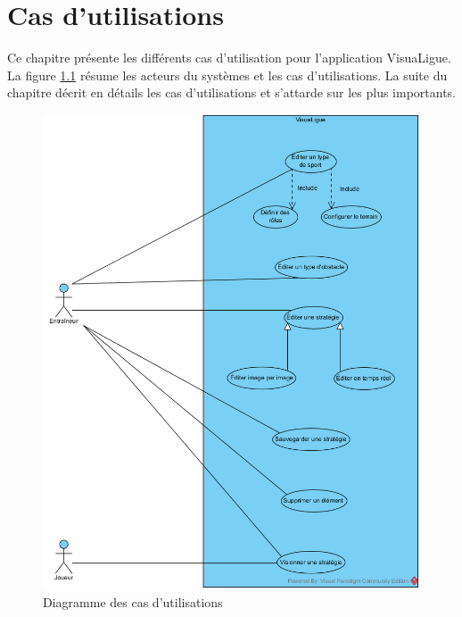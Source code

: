 
\chapter{Cas d'utilisations}
\label{s:cas_utilisation}

Ce chapitre présente les différents cas d'utilisation pour l'application VisuaLigue.
La figure \ref{fig:cas_utilisation_diag} résume les acteurs du systèmes et les cas d'utilisations.
La suite du chapitre décrit en détails les cas d'utilisations et s'attarde sur les plus importants.

\begin{figure}[htpb]
    \centering
    \includegraphics[scale=0.7]{fig/cas_utilisation_diag.png}
    \caption{Diagramme des cas d'utilisations}
    \label{fig:cas_utilisation_diag}
\end{figure}

\newpage




